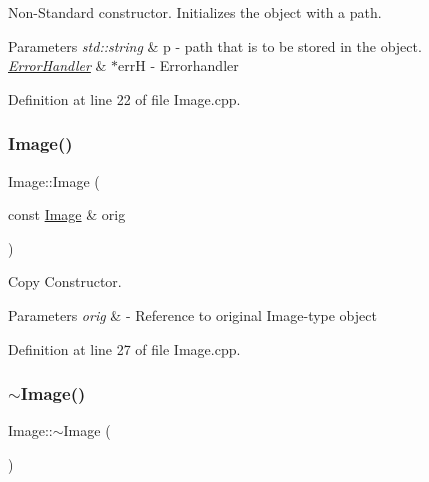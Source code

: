 Non-\/\+Standard constructor. Initializes the object with a path. 


\begin{DoxyParams}{Parameters}
{\em std\+::string} & p -\/ path that is to be stored in the object. \\
\hline
{\em \mbox{\hyperlink{classErrorHandler}{Error\+Handler}}} & $\ast$errH -\/ Errorhandler \\
\hline
\end{DoxyParams}


Definition at line 22 of file Image.\+cpp.

\mbox{\label{classImage_abda271aa11b907dda8c8c8176684227d}} 
\subsubsection{\texorpdfstring{Image()}{Image()}\hspace{0.1cm}{\footnotesize\ttfamily [3/3]}}
{\footnotesize\ttfamily Image\+::\+Image (\begin{DoxyParamCaption}\item[{const \mbox{\hyperlink{classImage}{Image}} \&}]{orig }\end{DoxyParamCaption})}



Copy Constructor. 


\begin{DoxyParams}{Parameters}
{\em orig} & -\/ Reference to original Image-\/type object \\
\hline
\end{DoxyParams}


Definition at line 27 of file Image.\+cpp.

\mbox{\label{classImage_a0294f63700543e11c0f0da85601c7ae5}} 
\subsubsection{\texorpdfstring{$\sim$Image()}{~Image()}}
{\footnotesize\ttfamily Image\+::$\sim$\+Image (\begin{DoxyParamCaption}{ }\end{DoxyParamCaption})\hspace{0.3cm}{\ttfamily [virtual]}}

